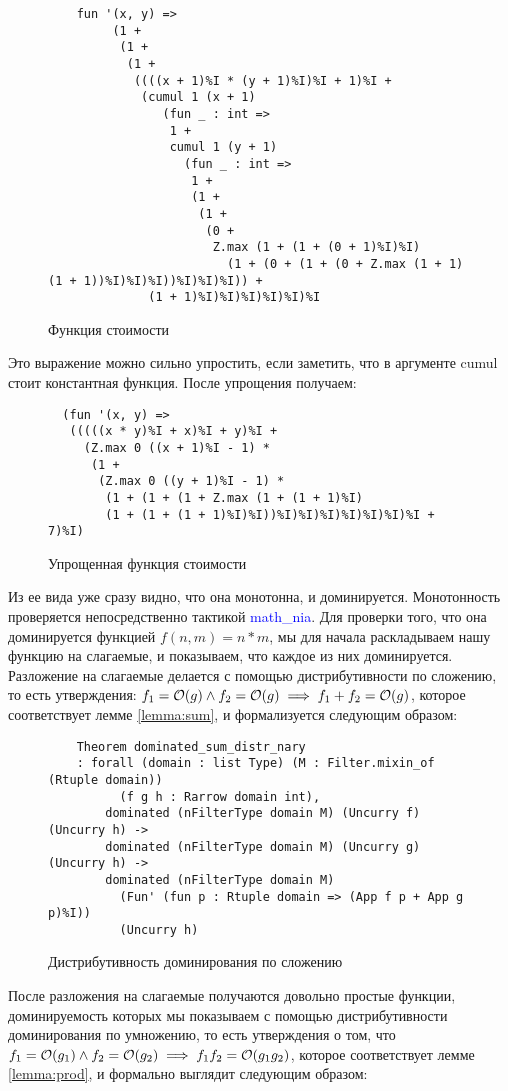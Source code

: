 \begin{figure}[H]
  \caption{Функция стоимости}
  \label{code:cost_function}
  \begin{verbatim}
    fun '(x, y) =>
         (1 +
          (1 +
           (1 +
            ((((x + 1)%I * (y + 1)%I)%I + 1)%I +
             (cumul 1 (x + 1)
                (fun _ : int =>
                 1 +
                 cumul 1 (y + 1)
                   (fun _ : int =>
                    1 +
                    (1 +
                     (1 +
                      (0 +
                       Z.max (1 + (1 + (0 + 1)%I)%I)
                         (1 + (0 + (1 + (0 + Z.max (1 + 1) (1 + 1))%I)%I)%I))%I)%I)%I)) +
              (1 + 1)%I)%I)%I)%I)%I)%I
  \end{verbatim}
\end{figure}

Это выражение можно сильно упростить, если заметить, что в аргументе cumul стоит константная функция. После упрощения получаем:

\begin{figure}[H]
  \caption{Упрощенная функция стоимости}
  \label{code:simplified_cost_function}
  \begin{verbatim}
  (fun '(x, y) =>
   (((((x * y)%I + x)%I + y)%I +
     (Z.max 0 ((x + 1)%I - 1) *
      (1 +
       (Z.max 0 ((y + 1)%I - 1) *
        (1 + (1 + (1 + Z.max (1 + (1 + 1)%I) 
        (1 + (1 + (1 + 1)%I)%I))%I)%I)%I)%I)%I)%I)%I + 7)%I)
  \end{verbatim}
\end{figure}

Из ее вида уже сразу видно, что она монотонна, и доминируется. Монотонность проверяется непосредственно тактикой \textcolor{blue}{math\_nia}.
Для проверки того, что она доминируется функцией $f(n, m) = n*m$, мы для начала раскладываем нашу функцию на слагаемые, и показываем,
что каждое из них доминируется. Разложение на слагаемые делается с помощью дистрибутивности по сложению, то есть утверждения:
$f_1 = \mathcal{O}(g) \land f_2 = \mathcal{O}(g) \implies f_1 + f_2 = \mathcal{O}(g)$, которое соответствует лемме \ref{lemma:sum}, и формализуется следующим образом:

\begin{figure}[H]
  \caption{Дистрибутивность доминирования по сложению}
  \label{code:dominated_sum_distr_nary}
  \begin{verbatim}
    Theorem dominated_sum_distr_nary
    : forall (domain : list Type) (M : Filter.mixin_of (Rtuple domain))
          (f g h : Rarrow domain int),
        dominated (nFilterType domain M) (Uncurry f) (Uncurry h) ->
        dominated (nFilterType domain M) (Uncurry g) (Uncurry h) ->
        dominated (nFilterType domain M)
          (Fun' (fun p : Rtuple domain => (App f p + App g p)%I)) 
          (Uncurry h)
  \end{verbatim}
\end{figure}
После разложения на слагаемые получаются довольно простые функции, доминируемость которых мы показываем с помощью дистрибутивности
доминирования по умножению, то есть утверждения о том, что \\
$f_1 = \mathcal{O}(g_1) \land f_2 = \mathcal{O}(g_2) \implies f_1f_2 = \mathcal{O}(g_1g_2)$, которое соответствует лемме \ref{lemma:prod}, и формально выглядит следующим образом:

